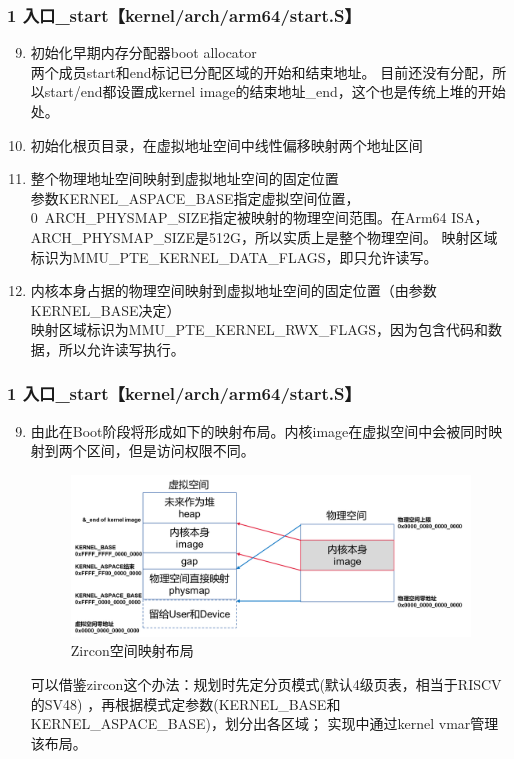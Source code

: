\documentclass[
8pt, %
]{beamer}
\begin{document}
	\begin{frame}
		\frametitle{1 入口\_start【kernel/arch/arm64/start.S】}
		\begin{enumerate}\setcounter{enumi}{8}
			\item 初始化早期内存分配器boot allocator\\
			两个成员start和end标记已分配区域的开始和结束地址。
			目前还没有分配，所以start/end都设置成kernel image的结束地址\_end，这个也是传统上堆的开始处。
			\item 初始化根页目录，在虚拟地址空间中线性偏移映射两个地址区间
			\item 整个物理地址空间映射到虚拟地址空间的固定位置\\
			参数KERNEL\_ASPACE\_BASE指定虚拟空间位置，0~ARCH\_PHYSMAP\_SIZE指定被映射的物理空间范围。在Arm64 ISA，ARCH\_PHYSMAP\_SIZE是512G，所以实质上是整个物理空间。
			映射区域标识为MMU\_PTE\_KERNEL\_DATA\_FLAGS，即只允许读写。
			\item 内核本身占据的物理空间映射到虚拟地址空间的固定位置（由参数KERNEL\_BASE决定）\\
			映射区域标识为MMU\_PTE\_KERNEL\_RWX\_FLAGS，因为包含代码和数据，所以允许读写执行。
		\end{enumerate}
	\end{frame}

	\begin{frame}
		\frametitle{1 入口\_start【kernel/arch/arm64/start.S】}
		\begin{enumerate}\setcounter{enumi}{8}
			\item 由此在Boot阶段将形成如下的映射布局。内核image在虚拟空间中会被同时映射到两个区间，但是访问权限不同。
			\begin{figure}
				\includegraphics[width=0.6\linewidth]{zircon_aspace.png}
				\caption{Zircon空间映射布局}
			\end{figure}

			\begin{block}{}
				可以借鉴zircon这个办法：规划时先定分页模式(默认4级页表，相当于RISCV的SV48) ，再根据模式定参数(KERNEL\_BASE和KERNEL\_ASPACE\_BASE)，划分出各区域；
				实现中通过kernel vmar管理该布局。
			\end{block}
		\end{enumerate}
	\end{frame}
\end{document}
